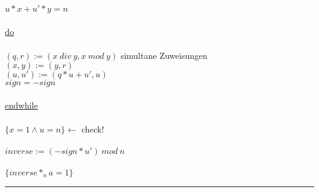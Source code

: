 \documentclass[18pt,a4paper]{article}
\newcommand{\tab}{\hspace*{2em}}
\begin{document}
\tab \tab $u*x + u' * y =n$\\
\\
\uline{do}\\
\\
\tab $(q,r) := (x \: div\: y, x\: mod\: y)$ \tab simultane Zuweisungen\\
\tab $(x,y) := (y,r)$\\
\tab $(u,u') := (q*u + u', u)$\\
\tab $sign = -sign$\\
\\
\uline{endwhile}\\
\\
$\{ x =1 \wedge u = n\} \leftarrow$ check!\\
\\
$inverse := (-sign * u')\: mod\: n$\\
\\
$\{inverse *_n a =1\}$\\
\rule{\textwidth}{0.4mm}\\




%
%
\end{document}
